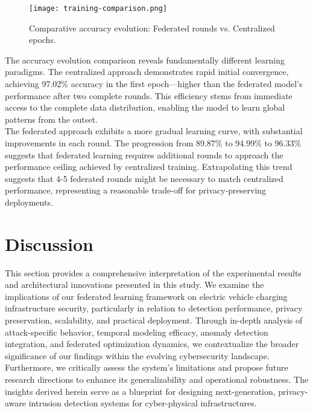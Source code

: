 \begin{figure}[H]
	\centering
	\texttt{[image: training-comparison.png]}
	\caption{Comparative accuracy evolution: Federated rounds vs. Centralized epochs.}
	\label{fig:accuracy-comparison}
\end{figure}

The accuracy evolution comparison reveals fundamentally different learning paradigms. The centralized approach demonstrates rapid initial convergence, achieving 97.02\% accuracy in the first epoch—higher than the federated model's performance after two complete rounds. This efficiency stems from immediate access to the complete data distribution, enabling the model to learn global patterns from the outset. \\

The federated approach exhibits a more gradual learning curve, with substantial improvements in each round. The progression from 89.87\% to 94.99\% to 96.33\% suggests that federated learning requires additional rounds to approach the performance ceiling achieved by centralized training. Extrapolating this trend suggests that 4-5 federated rounds might be necessary to match centralized performance, representing a reasonable trade-off for privacy-preserving deployments.




\section{Discussion}
This section provides a comprehensive interpretation of the experimental results and architectural innovations presented in this study. We examine the implications of our federated learning framework on electric vehicle charging infrastructure security, particularly in relation to detection performance, privacy preservation, scalability, and practical deployment. Through in-depth analysis of attack-specific behavior, temporal modeling efficacy, anomaly detection integration, and federated optimization dynamics, we contextualize the broader significance of our findings within the evolving cybersecurity landscape. Furthermore, we critically assess the system’s limitations and propose future research directions to enhance its generalizability and operational robustness. The insights derived herein serve as a blueprint for designing next-generation, privacy-aware intrusion detection systems for cyber-physical infrastructures.

